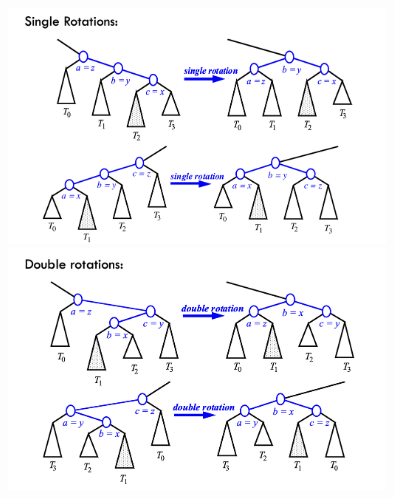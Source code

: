 \documentclass[12pt]{article}
\newcommand{\1}{\space \quad}
\newcommand{\2}{\quad \quad \quad}
\newcommand{\3}{\quad \quad \quad \quad \space}
\newcommand{\4}{\quad \quad \quad \quad \quad \quad}
\begin{document}
\begin{center}
  \includegraphics[width=0.75\textwidth]{image7.png}
  \includegraphics[width=0.75\textwidth]{image8.png}
\end{center}
\end{document}
